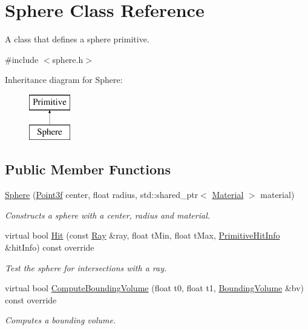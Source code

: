 \hypertarget{class_sphere}{}\section{Sphere Class Reference}
\label{class_sphere}


A class that defines a sphere primitive.  




{\ttfamily \#include $<$sphere.\+h$>$}

Inheritance diagram for Sphere\+:\begin{figure}[H]
\begin{center}
\leavevmode
\includegraphics[height=2.000000cm]{class_sphere}
\end{center}
\end{figure}
\subsection*{Public Member Functions}
\begin{DoxyCompactItemize}
\item 
\mbox{\hyperlink{class_sphere_addbe505252c330f303acbaed75a44b35}{Sphere}} (\mbox{\hyperlink{class_point}{Point3f}} center, float radius, std\+::shared\+\_\+ptr$<$ \mbox{\hyperlink{class_material}{Material}} $>$ material)
\begin{DoxyCompactList}\small\item\em Constructs a sphere with a center, radius and material. \end{DoxyCompactList}\item 
virtual bool \mbox{\hyperlink{class_sphere_a0a807bf78883890821395968bc93abbc}{Hit}} (const \mbox{\hyperlink{class_ray}{Ray}} \&ray, float t\+Min, float t\+Max, \mbox{\hyperlink{struct_primitive_hit_info}{Primitive\+Hit\+Info}} \&hit\+Info) const override
\begin{DoxyCompactList}\small\item\em Test the sphere for intersections with a ray. \end{DoxyCompactList}\item 
virtual bool \mbox{\hyperlink{class_sphere_a2398bffc7779ee90c49eda65860a64ed}{Compute\+Bounding\+Volume}} (float t0, float t1, \mbox{\hyperlink{class_bounding_volume}{Bounding\+Volume}} \&bv) const override
\begin{DoxyCompactList}\small\item\em Computes a bounding volume. \end{DoxyCompactList}\end{DoxyCompactItemize}
